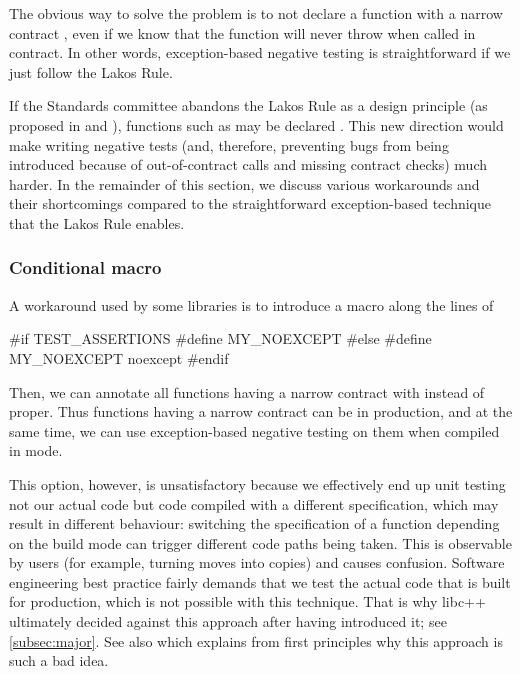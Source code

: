 The obvious way to solve the  problem is to not declare a function with a narrow contract , even if we know that the function will never throw when called in contract. In other words, exception-based negative testing is straightforward if we just follow the Lakos Rule. 

If the Standards committee abandons the Lakos Rule as a design principle (as proposed in \cite{P1656R2} and \cite{P2148R0}), functions such as \mbox{} may be declared . This new direction would make writing negative tests (and, therefore, preventing bugs from being introduced because of out-of-contract calls and missing contract checks) much harder. In the remainder of this section, we discuss various workarounds and their shortcomings compared to the straightforward exception-based technique that the Lakos Rule enables.

\subsubsection{Conditional  macro}
\label{subsubsec:conditional}

A workaround used by some libraries is to introduce a macro along the lines of
\begin{codeblock}
#if TEST_ASSERTIONS
  #define MY_NOEXCEPT 
#else
  #define MY_NOEXCEPT noexcept
#endif
\end{codeblock}
Then, we can annotate all functions having a narrow contract with  instead of  proper. Thus functions having a narrow contract can be  in production, and at the same time, we can use exception-based negative testing on them when compiled in \mbox{} mode.

This option, however, is unsatisfactory because we effectively end up unit testing not our actual code but code compiled with a different specification, which may result in different behaviour: switching the  specification of a function depending on the build mode can trigger different code paths being taken. This is observable by users (for example, turning moves into copies) and causes confusion. Software engineering best practice fairly demands that we test the actual code that is built for production, which is not possible with this technique. That is why libc++ ultimately decided against this approach after having introduced it; see \ref{subsec:major}. See also \cite{P2834R0} which explains from first principles why this approach is such a bad idea.

